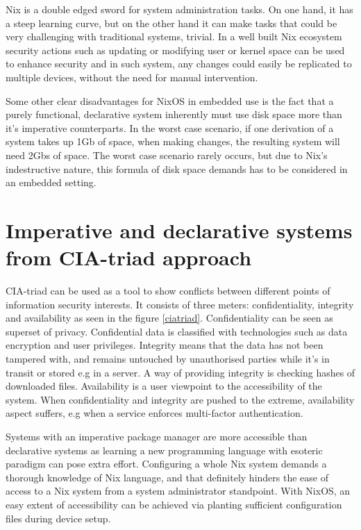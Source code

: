 Nix is a double edged sword for system administration tasks. On one
hand, it has a steep learning curve, but on the other hand it can make
tasks that could be very challenging with traditional systems,
trivial. In a well built Nix ecosystem security actions such as
updating or modifying user or kernel space can be used to enhance
security and in such system, any changes could easily be replicated to
multiple devices, without the need for manual intervention.

Some other clear disadvantages for NixOS in embedded use is the fact
that a purely functional, declarative system inherently must use disk
space more than it's imperative counterparts. In the worst case
scenario, if one derivation of a system takes up 1Gb of space, when
making changes, the resulting system will need 2Gbs of space. The
worst case scenario rarely occurs, but due to Nix's indestructive
nature, this formula of disk space demands has to be considered in an
embedded setting. \cite{dolstra2007purely}

\section{Imperative and declarative systems from CIA-triad approach} \label{imperativeanddeclarative}

CIA-triad can be used as a tool to show conflicts between different
points of information security interests. It consists of three meters:
confidentiality, integrity and availability as seen in the figure
\ref{ciatriad}. Confidentiality can be seen as superset of
privacy. Confidential data is classified with technologies such as
data encryption and user privileges. Integrity means that the data has
not been tampered with, and remains untouched by unauthorised parties
while it's in transit or stored e.g in a server. A way of providing
integrity is checking hashes of downloaded files. Availability is a
user viewpoint to the accessibility of the system. When
confidentiality and integrity are pushed to the extreme, availability
aspect suffers, e.g when a service enforces multi-factor
authentication. \cite{pender2019parkerian}

Systems with an imperative package manager are more accessible than
declarative systems as learning a new programming language with
esoteric paradigm can pose extra effort. Configuring a whole Nix
system demands a thorough knowledge of Nix language, and that
definitely hinders the ease of access to a Nix system from a system
administrator standpoint. With NixOS, an easy extent of accessibility
can be achieved via planting sufficient configuration files during
device setup.

